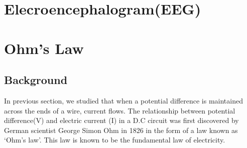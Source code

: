 \section{Elecroencephalogram(EEG)}
\section{Ohm's Law}
\subsection*{Background}
In previous section, we studied that when a potential difference is maintained across the ends of a wire, current flows. The relationship between potential difference(V) and electric current (I) in a D.C circuit was first discovered by German scientist George Simon Ohm in 1826 in the form of a law known as ‘Ohm’s law’. This law is known to be the fundamental law of electricity.






